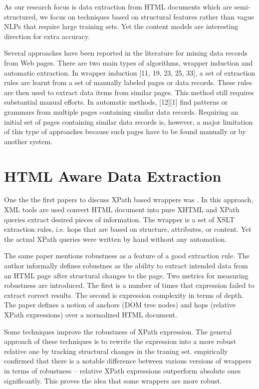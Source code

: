 As our research focus is data extraction from HTML documents which are semi-structured, we focus on techniques based on structural features rather than vague NLPs that require large training sets. Yet the content models are interesting direction for extra accuracy.

Several approaches have been reported in the literature for mining data records from Web pages.  There are two main types of algorithms, wrapper induction and automatic extraction. In wrapper induction [11, 19, 23, 25, 33], a set of extraction rules are learnt from a set of manually labeled pages or data records. These rules are then used to extract data items from similar pages. This method still requires substantial manual efforts. In automatic methods, [12][1] find patterns or grammars from multiple pages containing similar data records. Requiring an initial set of pages containing similar data records is, however, a major limitation of this type of approaches because such pages have to be found manually or by another system.

\section{HTML Aware Data Extraction}

One the the first papers to discuss XPath based wrappers was \cite{Myllymaki02robustweb}. In this approach, XML tools are used convert HTML document into pure XHTML and XPath queries extract desired pieces of information. The wrapper is a set of XSLT extraction rules, i.e. hops that are based on structure, attributes, or content. Yet the actual XPath queries were written by hand without any automation.

The same paper mentions robustness as a feature of a good extraction rule. The author informally defines robustnes as the ability to extract intended data from an HTML page after structural changes to the page. Two metrics for measuring robustness are introduced. The first is a number of times that expression failed to extract correct results. The second is expression complexity in terms of depth. The paper defines a notion of anchors (DOM tree nodes) and hops (relative XPath expressions) over a normalized HTML document. 

Some techniques \cite{Chang:2006:SWI:1159162.1159300} improve the robustness of XPath expression. The general approach of these techniques is to rewrite the expression into a more robust relative one by tracking structural changes in the traning set. \cite{Kowalkiewicz:2006:RWC:1135777.1135928} empirically confirmed that there is a notable difference between various versions of wrappers in terms of robustness – relative XPath expressions outperform absolute ones significantly. This proves the idea that some wrappers are more robust.


